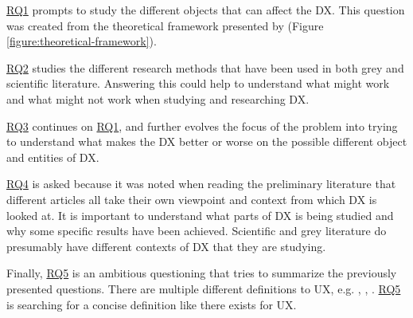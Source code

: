 \documentclass[english, 12pt, a4paper, sci, utf8, a-1b, online]{aaltothesis}
\begin{document}
\hyperref[RQ1]{RQ1} prompts to study the different objects that can affect the DX. This question was created from the theoretical framework presented by \textcite[70]{fagerholm-doctoral-thesis} (Figure \ref{figure:theoretical-framework}).

\hyperref[RQ2]{RQ2} studies the different research methods that have been used in both grey and scientific literature. Answering this could help to understand what might work and what might not work when studying and researching DX.

\hyperref[RQ3]{RQ3} continues on \hyperref[RQ1]{RQ1}, and further evolves the focus of the problem into trying to understand what makes the DX better or worse on the possible different object and entities of DX.

\hyperref[RQ4]{RQ4} is asked because it was noted when reading the preliminary literature that different articles all take their own viewpoint and context from which DX is looked at. It is important to understand what parts of DX is being studied and why some specific results have been achieved. Scientific and grey literature do presumably have different contexts of DX that they are studying.

Finally, \hyperref[RQ5]{RQ5} is an ambitious questioning that tries to summarize the previously presented questions. There are multiple different definitions to UX, e.g. \parencite{iso-9241-210}, \parencite{understanding-ux}, \parencite{ux-research-agenda}. \hyperref[RQ5]{RQ5} is searching for a concise definition like there exists for UX.




\end{document}
